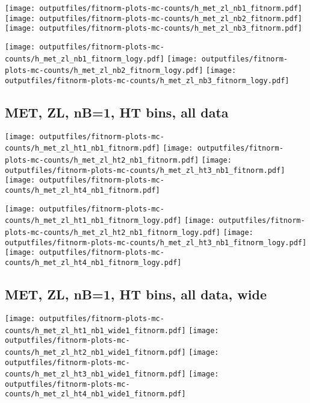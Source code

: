\documentclass[11pt]{article}
\begin{document}
    \noindent
     \texttt{[image: outputfiles/fitnorm-plots-mc-counts/h\_met\_zl\_nb1\_fitnorm.pdf]}
     \texttt{[image: outputfiles/fitnorm-plots-mc-counts/h\_met\_zl\_nb2\_fitnorm.pdf]}
     \texttt{[image: outputfiles/fitnorm-plots-mc-counts/h\_met\_zl\_nb3\_fitnorm.pdf]}

    \noindent
     \texttt{[image: outputfiles/fitnorm-plots-mc-counts/h\_met\_zl\_nb1\_fitnorm\_logy.pdf]}
     \texttt{[image: outputfiles/fitnorm-plots-mc-counts/h\_met\_zl\_nb2\_fitnorm\_logy.pdf]}
     \texttt{[image: outputfiles/fitnorm-plots-mc-counts/h\_met\_zl\_nb3\_fitnorm\_logy.pdf]}








     \subsection{ MET, ZL, nB=1, HT bins, all data}

    \noindent
     \texttt{[image: outputfiles/fitnorm-plots-mc-counts/h\_met\_zl\_ht1\_nb1\_fitnorm.pdf]}
     \texttt{[image: outputfiles/fitnorm-plots-mc-counts/h\_met\_zl\_ht2\_nb1\_fitnorm.pdf]}
     \texttt{[image: outputfiles/fitnorm-plots-mc-counts/h\_met\_zl\_ht3\_nb1\_fitnorm.pdf]}
     \texttt{[image: outputfiles/fitnorm-plots-mc-counts/h\_met\_zl\_ht4\_nb1\_fitnorm.pdf]}

    \noindent
     \texttt{[image: outputfiles/fitnorm-plots-mc-counts/h\_met\_zl\_ht1\_nb1\_fitnorm\_logy.pdf]}
     \texttt{[image: outputfiles/fitnorm-plots-mc-counts/h\_met\_zl\_ht2\_nb1\_fitnorm\_logy.pdf]}
     \texttt{[image: outputfiles/fitnorm-plots-mc-counts/h\_met\_zl\_ht3\_nb1\_fitnorm\_logy.pdf]}
     \texttt{[image: outputfiles/fitnorm-plots-mc-counts/h\_met\_zl\_ht4\_nb1\_fitnorm\_logy.pdf]}


    \clearpage
     \subsection{ MET, ZL, nB=1, HT bins, all data, wide}

    \noindent
     \texttt{[image: outputfiles/fitnorm-plots-mc-counts/h\_met\_zl\_ht1\_nb1\_wide1\_fitnorm.pdf]}
     \texttt{[image: outputfiles/fitnorm-plots-mc-counts/h\_met\_zl\_ht2\_nb1\_wide1\_fitnorm.pdf]}
     \texttt{[image: outputfiles/fitnorm-plots-mc-counts/h\_met\_zl\_ht3\_nb1\_wide1\_fitnorm.pdf]}
     \texttt{[image: outputfiles/fitnorm-plots-mc-counts/h\_met\_zl\_ht4\_nb1\_wide1\_fitnorm.pdf]}
\end{document}
